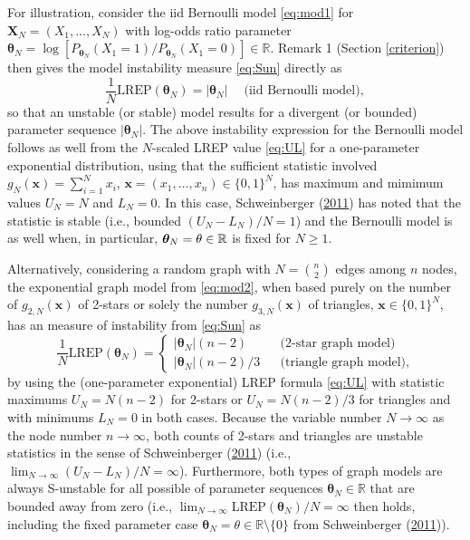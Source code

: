 \documentclass[]{article}
\theoremstyle{definition}
\newcommand{\REP}{\mathrm{LREP}}
\begin{document}
For illustration, consider the iid Bernoulli model \eqref{eq:mod1} for
\(\boldsymbol X_N=(X_1,\ldots,X_N)\) with log-odds ratio parameter
\(\boldsymbol \theta_N = \log[ P_{\boldsymbol \theta_N}(X_1=1)/ P_{\boldsymbol \theta_N}(X_1=0)]\in\mathbb{R}\).
Remark 1 (Section \ref{criterion}) then gives the model instability
measure \eqref{eq:Sun} directly as \[
\frac{1}{N}\REP(\boldsymbol \theta_N ) = |\boldsymbol \theta_N|\quad\; \mbox{(iid Bernoulli model)},
\] so that an unstable (or stable) model results for a divergent (or
bounded) parameter sequence \(|\boldsymbol \theta_N|\). The above
instability expression for the Bernoulli model follows as well from the
\(N\)-scaled LREP value \eqref{eq:UL} for a one-parameter exponential
distribution, using that the sufficient statistic involved
\(g_N(\boldsymbol x)= \sum_{i=1}^N x_i\),
\(\boldsymbol x =(x_1,\ldots,x_n)\in\{0,1\}^N\), has maximum and mimimum
values \(U_N=N\) and \(L_N=0\). In this case, Schweinberger
(\protect\hyperlink{ref-schweinberger2011instability}{2011}) has noted
that the statistic is stable (i.e., bounded \((U_N-L_N)/N=1\)) and the
Bernoulli model is as well when, in particular,
\(\boldsymbol \theta_N=\bold \theta \in\mathbb{R}\) is fixed for
\(N \geq 1\).

Alternatively, considering a random graph with \(N={n \choose 2}\) edges
among \(n\) nodes, the exponential graph model from \eqref{eq:mod2}, when
based purely on the number of \(g_{2,N}(\boldsymbol x)\) of 2-stars or
solely the number \(g_{3,N}(\boldsymbol x)\) of triangles,
\(\boldsymbol x\in\{0,1\}^N\), has an measure of instability from
\eqref{eq:Sun} as \[
\frac{1}{N}\REP(\boldsymbol \theta_N )  = \left\{ \begin{array}{lcl} |\boldsymbol \theta_N| (n-2) && \mbox{(2-star graph model)}\\
|\boldsymbol \theta_N|(n-2)/3 &&\mbox{(triangle graph model)},\end{array}\right.
\] by using the (one-parameter exponential) LREP formula \eqref{eq:UL}
with statistic maximums \(U_N= N(n-2)\) for 2-stars or \(U_N= N(n-2)/3\)
for triangles and with minimums \(L_N=0\) in both cases. Because the
variable number \(N\to \infty\) as the node number \(n\to \infty\), both
counts of 2-stars and triangles are unstable statistics in the sense of
Schweinberger
(\protect\hyperlink{ref-schweinberger2011instability}{2011}) (i.e.,
\(\lim_{N\to \infty} (U_N-L_N)/N=\infty\)). Furthermore, both types of
graph models are always S-unstable for all possible of parameter
sequences \(\boldsymbol \theta_N \in\mathbb{R}\) that are bounded away
from zero (i.e.,
\(\lim_{N\to \infty}\REP(\boldsymbol \theta_N )/N=\infty\) then holds,
including the fixed parameter case
\(\boldsymbol \theta_N=\theta\in\mathbb{R}\setminus \{0\}\) from
Schweinberger
(\protect\hyperlink{ref-schweinberger2011instability}{2011})).
\end{document}
